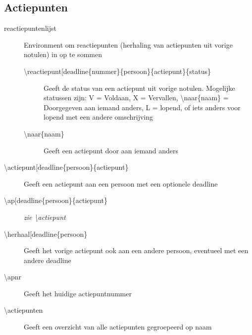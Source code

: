 \documentclass[a4paper]{notulen}
\begin{document}
		\subsection{Actiepunten}
		\begin{description}
			\item[reactiepuntenlijst] Environment om reactiepunten (herhaling van actiepunten uit vorige notulen) in op te sommen
			\begin{description}
    			\item[\textbackslash reactiepunt[deadline\rbrack\{nummer\}\{persoon\}\{actiepunt\}\{status\}] Geeft de status van een actiepunt uit vorige notulen. Mogelijke statussen zijn: V = Voldaan, X = Vervallen, \textbackslash naar\{naam\} = Doorgegeven aan iemand anders, L = lopend, of iets anders voor lopend met een andere omschrijving
				\item[\textbackslash naar\{naam\}] Geeft een actiepunt door aan iemand anders
 			\end{description}
			\item[\textbackslash actiepunt[deadline\rbrack\{persoon\}\{actiepunt\}] Geeft een actiepunt aan een persoon met een optionele deadline
			\item[\textbackslash ap[deadline\rbrack\{persoon\}\{actiepunt\}] \emph{zie \textbackslash actiepunt}
			\item[\textbackslash herhaal[deadline\rbrack\{persoon\}] Geeft het vorige actiepunt ook aan een andere persoon, eventueel met een andere deadline
			\item[\textbackslash apnr] Geeft het huidige actiepuntnummer
			\item[\textbackslash actiepunten] Geeft een overzicht van alle actiepunten gegroepeerd op naam

		\end{description}
	
\end{document}

